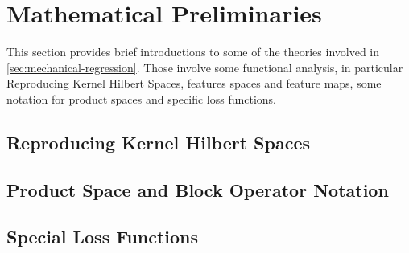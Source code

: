 \section{Mathematical Preliminaries}
\label{sec:preliminaries}

This section provides brief introductions to some of the theories involved in \cref{sec:mechanical-regression}.
Those involve some functional analysis, in particular Reproducing Kernel Hilbert Spaces, features spaces and feature maps, some notation for product spaces and specific loss functions.

\subsection{Reproducing Kernel Hilbert Spaces}



%
%

\subsection{Product Space and Block Operator Notation}
\label{sec:block-operator-notation}



\subsection{Special Loss Functions}


%
